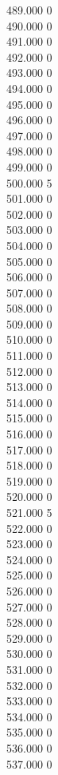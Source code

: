 { 489.000	0 \\
 490.000	0 \\
 491.000	0 \\
 492.000	0 \\
 493.000	0 \\
 494.000	0 \\
 495.000	0 \\
 496.000	0 \\
 497.000	0 \\
 498.000	0 \\
 499.000	0 \\
 500.000	5 \\
 501.000	0 \\
 502.000	0 \\
 503.000	0 \\
 504.000	0 \\
 505.000	0 \\
 506.000	0 \\
 507.000	0 \\
 508.000	0 \\
 509.000	0 \\
 510.000	0 \\
 511.000	0 \\
 512.000	0 \\
 513.000	0 \\
 514.000	0 \\
 515.000	0 \\
 516.000	0 \\
 517.000	0 \\
 518.000	0 \\
 519.000	0 \\
 520.000	0 \\
 521.000	5 \\
 522.000	0 \\
 523.000	0 \\
 524.000	0 \\
 525.000	0 \\
 526.000	0 \\
 527.000	0 \\
 528.000	0 \\
 529.000	0 \\
 530.000	0 \\
 531.000	0 \\
 532.000	0 \\
 533.000	0 \\
 534.000	0 \\
 535.000	0 \\
 536.000	0 \\
 537.000	0 \\
}
